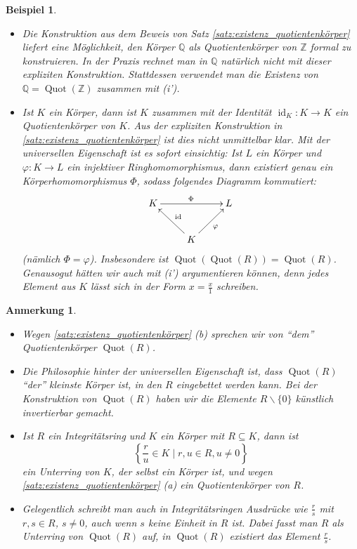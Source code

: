 \documentclass[a4paper, twoside, 11pt, ngerman]{report}
\newcommand{\QQ}{\mathds Q}
\newcommand{\ZZ}{\mathds Z}
\renewcommand{\setminus}{\smallsetminus}
\DeclareMathOperator{\Quot}{Quot}
\theoremstyle{definistyle}
\newtheorem{anm}[satz]{Anmerkung}
\newtheorem{bsp}[satz]{Beispiel}
\theoremstyle{remark}
\begin{document}
\begin{bsp}\label{bsp:quotient_koerper_konstruktion}
\begin{itemize}
    \item[(a)] Die Konstruktion aus dem Beweis von Satz \ref{satz:existenz_quotientenkörper} liefert eine Möglichkeit, den Körper $\mathbb{Q}$ als Quotientenkörper von $\ZZ$ formal zu konstruieren.
    In der Praxis rechnet man in $\QQ$ natürlich nicht mit dieser expliziten Konstruktion. Stattdessen verwendet man die Existenz von $\QQ=\Quot(\ZZ)$ zusammen mit (i'). 
    \item[(b)] Ist $K$ ein Körper, dann ist $K$ zusammen mit der Identität $\operatorname{id}_K \colon K \to K$ ein Quotientenkörper von $K$. Aus der expliziten Konstruktion in \ref{satz:existenz_quotientenkörper} ist dies nicht unmittelbar klar.
    Mit der universellen Eigenschaft ist es sofort einsichtig: Ist $L$ ein Körper und $\varphi \colon K \to L$ ein injektiver Ringhomomorphismus, dann existiert genau ein Körperhomomorphismus $\Phi$, sodass folgendes Diagramm kommutiert:
\[
\begin{xy}
\xymatrix{
K \ar[rr]^{\Phi}  & & L \\
& \ar[ul]_{\operatorname{id}} K \ar[ur]_{\varphi} &
}
\end{xy}
\]
(nämlich $\Phi = \varphi$). Insbesondere ist $\Quot(\Quot(R))=\Quot(R)$. Genausogut hätten wir auch mit (i') argumentieren können, denn jedes Element aus $K$ lässt sich in der Form $x=\frac{x}{1}$ schreiben.
\end{itemize}
\end{bsp}

\begin{anm}\label{anm:quotient_koerper_besonderheiten}
\begin{itemize}
    \item Wegen \ref{satz:existenz_quotientenkörper} (b) sprechen wir von "`dem"' Quotientenkörper $\Quot(R)$.
    \item Die Philosophie hinter der universellen Eigenschaft ist, dass $\Quot(R)$ "`der"' kleinste Körper ist, in den $R$ eingebettet werden kann. Bei der Konstruktion von $\Quot(R)$ haben wir die Elemente $R \setminus \{0\}$ künstlich invertierbar gemacht.
    \item Ist $R$ ein Integritätsring und $K$ ein Körper mit $R \subseteq K$, dann ist
    \[
    \left\{ \frac{r}{u} \in K \mid r, u \in R, u \neq 0 \right\}
    \]
    ein Unterring von $K$, der selbst ein Körper ist, und wegen \ref{satz:existenz_quotientenkörper} (a) ein Quotientenkörper von $R$.
    \item Gelegentlich schreibt man auch in Integritätsringen Ausdrücke wie $\frac{r}{s}$ mit $r, s \in R$, $s \neq 0$, auch wenn $s$ keine Einheit in $R$ ist. Dabei fasst man $R$ als Unterring von $\Quot(R)$ auf, in $\Quot(R)$ existiert das Element $\frac{r}{s}$.
\end{itemize}
\end{anm}
\end{document}
